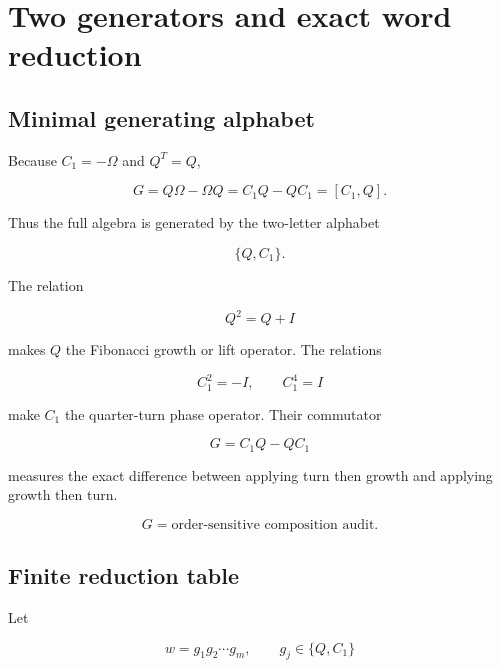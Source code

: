 \documentclass[11pt,letterpaper]{article}
\theoremstyle{clearonyx}
\begin{document}
\section{Two generators and exact word reduction}

\subsection{Minimal generating alphabet}

Because $C_1=-\Omega$ and $Q^T=Q$,

\begin{equation}
G=Q\Omega-\Omega Q=C_1Q-QC_1=[C_1,Q].
\end{equation}

Thus the full algebra is generated by the two-letter alphabet

\begin{equation}
\boxed{\{Q,C_1\}}.
\end{equation}

The relation

\begin{equation}
Q^2=Q+I
\end{equation}

makes $Q$ the Fibonacci growth or lift operator.  The relations

\begin{equation}
C_1^2=-I,
\qquad
C_1^4=I
\end{equation}

make $C_1$ the quarter-turn phase operator.  Their commutator

\begin{equation}
G=C_1Q-QC_1
\end{equation}

measures the exact difference between applying turn then growth and applying growth then turn.

\begin{resultbox}
\begin{equation*}
\boxed{G=\text{order-sensitive composition audit}.}
\end{equation*}
\end{resultbox}

\subsection{Finite reduction table}

Let

\begin{equation}
w=g_1g_2\cdots g_m,
\qquad
g_j\in\{Q,C_1\}
\end{equation}
\end{document}
